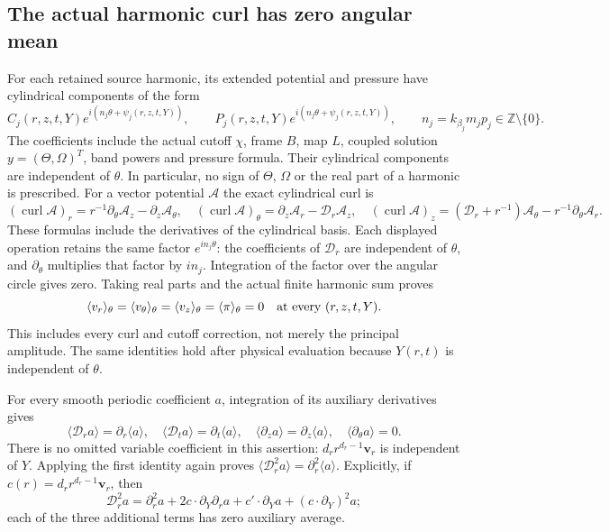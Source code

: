 \subsection{The actual harmonic curl has zero angular mean}
\label{nsmom:zero_mean}
For each retained source harmonic, its extended potential and pressure
have cylindrical components of the form
\[
 C_j(r,z,t,Y)e^{i(n_j\theta+\psi_j(r,z,t,Y))},\qquad
 P_j(r,z,t,Y)e^{i(n_j\theta+\psi_j(r,z,t,Y))},\qquad
 n_j=k_{\beta_j}m_jp_j\in\mathbb Z\setminus\{0\}.
\]
The coefficients include the actual cutoff $\chi$, frame $B$, map $L$,
coupled solution $y=(\Theta,\Omega)^T$, band powers and pressure formula.
Their cylindrical components are independent of $\theta$. In particular,
no sign of $\Theta$, $\Omega$ or the real part of a harmonic is prescribed.
For a vector potential $\mathcal A$ the exact cylindrical curl is
\[
 (\operatorname{curl}\mathcal A)_r=r^{-1}\partial_\theta\mathcal A_z
                         -\partial_z\mathcal A_\theta,
 \quad
 (\operatorname{curl}\mathcal A)_\theta=\partial_z\mathcal A_r
                         -\mathscr D_r\mathcal A_z,
 \quad
 (\operatorname{curl}\mathcal A)_z=(\mathscr D_r+r^{-1})\mathcal A_\theta
                         -r^{-1}\partial_\theta\mathcal A_r.
\]
These formulas include the derivatives of the cylindrical basis.
Each displayed operation retains the same factor $e^{in_j\theta}$:
the coefficients of $\mathscr D_r$ are independent of $\theta$, and
$\partial_\theta$ multiplies that factor by $in_j$. Integration of the
factor over the angular circle gives zero. Taking real parts and the
actual finite harmonic sum proves
\begin{equation}
 \langle v_r\rangle_\theta=\langle v_\theta\rangle_\theta
 =\langle v_z\rangle_\theta=\langle\pi\rangle_\theta=0
 \quad\hbox{at every }(r,z,t,Y).
 \label{nsmom:mean_zero}
\end{equation}
This includes every curl and cutoff correction, not merely the
principal amplitude. The same identities hold after physical
evaluation because $Y(r,t)$ is independent of $\theta$.

For every smooth periodic coefficient $a$, integration of its auxiliary
derivatives gives
\begin{equation}
 \langle\mathscr D_r a\rangle=\partial_r\langle a\rangle,
 \quad\langle\mathscr D_t a\rangle=\partial_t\langle a\rangle,
 \quad\langle\partial_z a\rangle=\partial_z\langle a\rangle,
 \quad\langle\partial_\theta a\rangle=0.
 \label{nsmom:commute}
\end{equation}
There is no omitted variable coefficient in this assertion:
$d_r r^{d_r-1}\mathbf v_r$ is independent of $Y$. Applying the first
identity again proves
$\langle\mathscr D_r^2a\rangle=\partial_r^2\langle a\rangle$.
Explicitly, if $c(r)=d_r r^{d_r-1}\mathbf v_r$, then
\[
 \mathscr D_r^2 a=\partial_r^2a+2c\cdot\partial_Y\partial_r a
 +c'\cdot\partial_Ya+(c\cdot\partial_Y)^2a;
\]
each of the three additional terms has zero auxiliary average.

